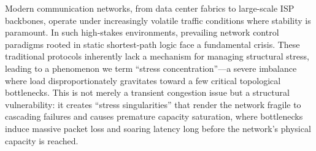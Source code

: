 \documentclass{ccjnl}
\begin{document}
Modern communication networks, from data center fabrics to large-scale ISP backbones, operate under increasingly volatile traffic conditions where stability is paramount. 
In such high-stakes environments, prevailing network control paradigms rooted in static shortest-path logic face a fundamental crisis. 
These traditional protocols inherently lack a mechanism for managing structural stress, leading to a phenomenon we term ``stress concentration''---a severe imbalance where load disproportionately gravitates toward a few critical topological bottlenecks.
This is not merely a transient congestion issue but a structural vulnerability: it creates ``stress singularities'' that render the network fragile to cascading failures and causes premature capacity saturation, where bottlenecks induce massive packet loss and soaring latency long before the network's physical capacity is reached.
\end{document}
